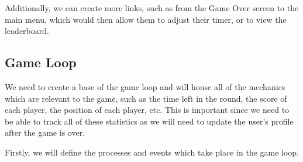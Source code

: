 \vs
Additionally, we can create more links, such as from the Game Over screen to the main menu, which would then allow them to adjust their timer, or to view the leaderboard.
\vs
\subsection{Game Loop}

We need to create a base of the game loop and will house all of the mechanics which are relevant to the game, such as the time left in the round, the score of each player, the position of each player, etc. This is important since we need to be able to track all of these statistics as we will need to update the user's profile after the game is over.

\vs
Firstly, we will define the processes and events which take place in the game loop.

